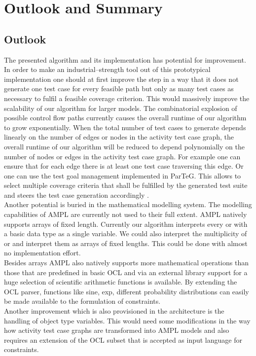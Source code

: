 \chapter{Outlook and Summary}
\section{Outlook}
The presented algorithm and its implementation has potential for improvement.
In order to make an industrial--strength tool out of this prototypical implementation one should at first improve the  step in a way that it does not generate one test case for every feasible path but only as many test cases as necessary to fulfil a feasible coverage criterion. This would massively improve the scalability of our algorithm for larger models. The combinatorial explosion of possible control flow paths currently causes the overall runtime of our algorithm to grow exponentially. When the total number of test cases to generate depends linearly on the number of edges or nodes in the activity test case graph, the overall runtime of our algorithm will be reduced to depend polynomially on the number of nodes or edges in the activity test case graph. For example one can ensure that for each edge there is at least one test case traversing this edge. Or one can use the test goal management implemented in ParTeG. This allows to select multiple coverage criteria that shall be fulfilled by the generated test suite and steers the test case generation accordingly \cite{weissleder2010parteg}.\\
Another potential is buried in the mathematical modelling system. The modelling capabilities of AMPL are currently not used to their full extent. AMPL natively supports arrays of fixed length. Currently our algorithm interprets every  or  with a basic data type as a single variable. We could also interpret the multiplicity of  or  and interpret them as arrays of fixed lengths. This could be done with almost no implementation effort.\\
Besides arrays AMPL also natively supports more mathematical operations than those that are predefined in basic OCL and via an external library support for a huge selection of scientific arithmetic functions is available. By extending the OCL parser, functions like sine, exp, different probability distributions can easily be made available to the formulation of constraints.\\
Another improvement which is also provisioned in the architecture is the handling of object type variables. This would need some modifications in the way how activity test case graphs are transformed into AMPL models and also requires an extension of the OCL subset that is accepted as input language for constraints.\\
